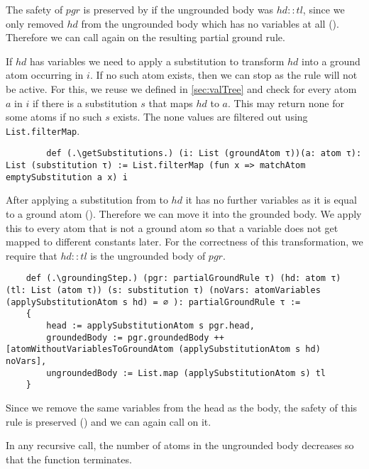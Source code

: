     The safety of $pgr$ is preserved by \moveAtomWithoutVariables if the ungrounded body was $hd::tl$, since we only removed $hd$ from the ungrounded body which has no variables at all (\moveAtomWithoutVariablesPreservesSafety).
    Therefore we can call \exploreGrounding again on the resulting partial ground rule.

    If $hd$ has variables we need to apply a substitution to transform $hd$ into a ground atom occurring in $i$. If no such atom exists, then we can stop as the rule will not be active. For this, we reuse \matchAtom we defined in \cref{sec:valTree} and check for every atom $a$ in $i$ if there is a substitution $s$ that maps $hd$ to $a$. This may return none for some atoms if no such $s$ exists. The none values are filtered out using \lstinline|List.filterMap|.

    \begin{lstlisting}
        def (.\getSubstitutions.) (i: List (groundAtom τ))(a: atom τ): List (substitution τ) := List.filterMap (fun x => matchAtom emptySubstitution a x) i
    \end{lstlisting}

    After applying a substitution from \getSubstitutions to $hd$ it has no further variables as it is equal to a ground atom (\inGetSubstitutionsImplNoVars). Therefore we can move it into the grounded body. We apply this to every atom that is not a ground atom so that a variable does not get mapped to different constants later. For the correctness of this transformation, we require that $hd::tl$ is the ungrounded body of $pgr$.

    \begin{lstlisting}
    def (.\groundingStep.) (pgr: partialGroundRule τ) (hd: atom τ) (tl: List (atom τ)) (s: substitution τ) (noVars: atomVariables (applySubstitutionAtom s hd) = ∅ ): partialGroundRule τ :=
    {
        head := applySubstitutionAtom s pgr.head,
        groundedBody := pgr.groundedBody ++ [atomWithoutVariablesToGroundAtom (applySubstitutionAtom s hd) noVars],
        ungroundedBody := List.map (applySubstitutionAtom s) tl
    }

    \end{lstlisting}

    Since we remove the same variables from the head as the body, the safety of this rule is preserved (\groundingStepPreservesSafety) and we can again call \exploreGrounding on it.

    In any recursive call, the number of atoms in the ungrounded body decreases so that the function terminates.

